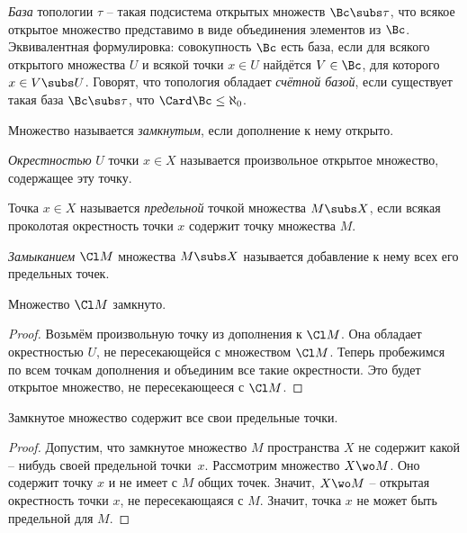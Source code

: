 \documentclass[a4paper]{article}
\begin{document}
\begin{df}
\emph{База} топологии $\tau$ -- такая подсистема
открытых множеств $\Bc \subs \tau$, что всякое открытое множество представимо в виде объединения
элементов из $\Bc$. Эквивалентная формулировка: совокупность $\Bc$ есть база, если
для всякого открытого множества $U$ и всякой точки $x \in U$ найдётся $V \in \Bc$, для которого
$x \in V \subs U$. Говорят, что топология обладает \emph{счётной базой}, если существует такая база $\Bc \subs \tau$,
что $\Card \Bc \le \aleph_0$.
\end{df}

\begin{df}
Множество называется \emph{замкнутым}, если дополнение к нему открыто.
\end{df}

\begin{df}
\emph{Окрестностью} $U$ точки $x \in X$ называется произвольное открытое множество,
содержащее эту точку.
\end{df}


\begin{df}
Точка $x \in X$ называется \emph{предельной} точкой множества $M \subs X$,
если всякая проколотая окрестность точки $x$ содержит точку множества $M$.
\end{df}

\begin{df}
\emph{Замыканием} $\Cl M$ множества $M \subs X$ называется добавление к нему всех его предельных точек.
\end{df}

\begin{stm}
Множество $\Cl M$ замкнуто.
\end{stm}
\begin{proof}
Возьмём произвольную точку из дополнения к $\Cl M$. Она обладает окрестностью $U$, не пересекающейся
с множеством $\Cl M$. Теперь пробежимся по всем точкам дополнения и объединим все такие
окрестности. Это будет открытое множество, не пересекающееся с $\Cl M$.
\end{proof}

\begin{stm}
Замкнутое множество содержит все свои предельные точки.
\end{stm}
\begin{proof}
Допустим, что замкнутое множество $M$ пространства $X$ не содержит какой -- нибудь
своей предельной точки~$x$. Рассмотрим множество $X \wo M$. Оно содержит точку $x$
и не имеет с $M$ общих точек. Значит, $X\wo M$ -- открытая окрестность точки $x$,
не пересекающаяся с $M$. Значит, точка $x$ не может быть предельной для $M$.
\end{proof}
\end{document}
